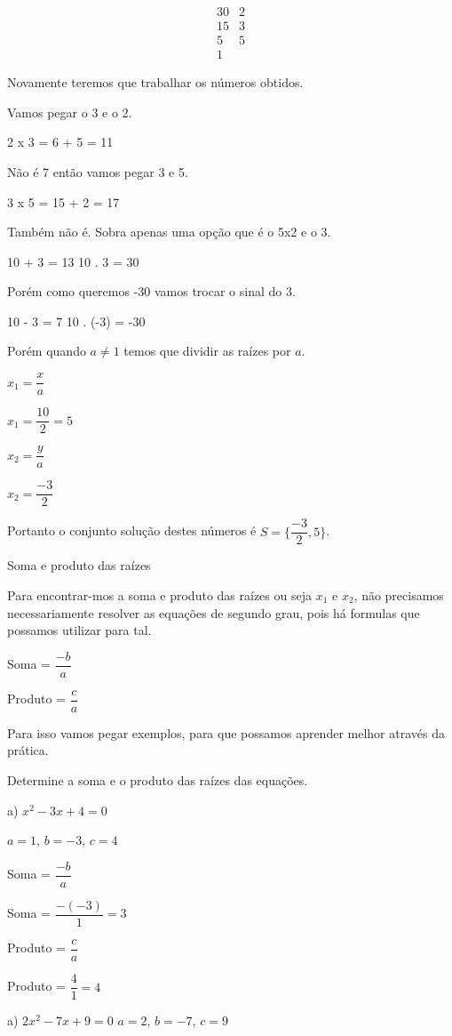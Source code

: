 \documentclass[letterpaper]{book}
\begin{document}
\[
\begin{array}{c|cc}
30 & 2 \\
15 & 3 \\
5  & 5 \\ 
1
\end{array}
\]

Novamente teremos que trabalhar os números obtidos.

Vamos pegar o 3 e o 2.

2 x 3 = 6 + 5 = 11

Não é 7 então vamos pegar 3 e 5.

3 x 5 = 15 + 2 = 17

Também não é. Sobra apenas uma opção que é o 5x2 e o 3.

10 + 3 = 13
10 . 3 = 30

Porém como queremos -30 vamos trocar o sinal do 3.

10 - 3 = 7
10 . (-3) = -30

Porém quando \(a \neq 1\) temos que dividir as raízes por $a$.

\(x_1 = \dfrac{x}{a}\)

\(x_1 = \dfrac{10}{2} = 5\)

\(x_2 = \dfrac{y}{a}\)

\(x_2 = \dfrac{-3}{2}\)

Portanto o conjunto solução destes números é \(S = \{\dfrac{-3}{2},5\}\).

 Soma e produto das raízes

Para encontrar-mos a soma e produto das raízes ou seja \(x_1\) e $x_2$, não precisamos necessariamente resolver as equações de segundo grau, pois há formulas que possamos utilizar para tal.

Soma = \(\dfrac{-b}{a}\)

Produto = \(\dfrac{c}{a}\)

Para isso vamos pegar exemplos, para que possamos aprender melhor através da prática.

Determine a soma e o produto das raízes das equações.

a) \(x^{2} - 3x + 4 = 0\)


\(a = 1\), \(b = -3\), \(c = 4\)

Soma = \(\dfrac{-b}{a}\)

Soma = \(\dfrac{-(-3)}{1} = 3\)

Produto = \(\dfrac{c}{a}\)

Produto = \(\dfrac{4}{1} = 4\)

a) \(2x^{2} - 7x + 9 = 0\)
\(a = 2\), $b = -7$, $c = 9$
\end{document}

